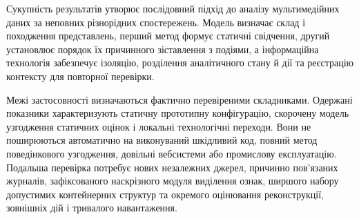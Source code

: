 Сукупність результатів утворює послідовний підхід до аналізу мультимедійних даних за неповних різнорідних спостережень. Модель визначає склад і походження представлень, перший метод формує статичні свідчення, другий установлює порядок їх причинного зіставлення з подіями, а інформаційна технологія забезпечує ізоляцію, розділення аналітичного стану й дії та реєстрацію контексту для повторної перевірки.

Межі застосовності визначаються фактично перевіреними складниками. Одержані показники характеризують статичну прототипну конфігурацію, скорочену модель узгодження статичних оцінок і локальні технологічні переходи. Вони не поширюються автоматично на виконуваний шкідливий код, повний метод поведінкового узгодження, довільні вебсистеми або промислову експлуатацію. Подальша перевірка потребує нових незалежних джерел, причинно пов’язаних журналів, зафіксованого наскрізного модуля виділення ознак, ширшого набору допустимих контейнерних структур та окремого оцінювання реконструкції, зовнішніх дій і тривалого навантаження.

\clearpage
